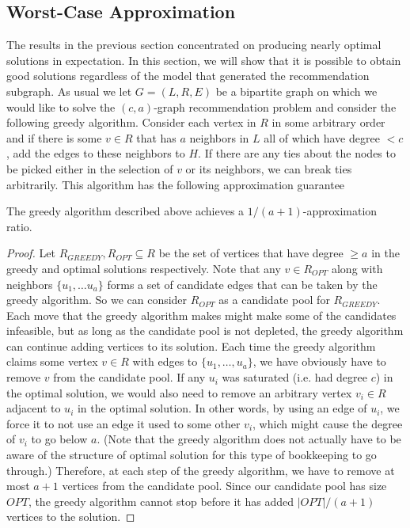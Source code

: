 %
\subsection{Worst-Case Approximation}
The results in the previous section concentrated on producing nearly
optimal solutions in expectation. In this section, we will show that
it is possible to obtain good solutions regardless of the model that
generated the recommendation subgraph. As usual we let $G=(L,R,E)$ be a
bipartite graph on which we would like to solve the $(c,a)$-graph
recommendation problem and consider the following greedy
algorithm. Consider each vertex in $R$ in some arbitrary order and if
there is some $v \in R$ that has $a$ neighbors in $L$ all of which
have degree $< c$, add the edges to these neighbors to $H$. If there
are any ties about the nodes to be picked either in the selection of
$v$ or its neighbors, we can break ties arbitrarily. This algorithm
has the following approximation guarantee

\begin{thm}
The greedy algorithm described above achieves a $1/(a+1)$-approximation ratio.
\end{thm}
\begin{proof}
Let $R_{GREEDY}, R_{OPT}\subseteq R$ be the set of vertices that have
degree $\geq a$ in the greedy and optimal solutions respectively. Note
that any $v \in R_{OPT}$ along with neighbors $\{u_1,\ldots u_a\}$
forms a set of candidate edges that can be taken by the greedy
algorithm. So we can consider $R_{OPT}$ as a candidate pool for
$R_{GREEDY}$. Each move that the greedy algorithm makes might make
some of the candidates infeasible, but as long as the candidate pool
is not depleted, the greedy algorithm can continue adding vertices to
its solution. Each time the greedy algorithm claims some vertex $v\in
R$ with edges to $\{u_1,\ldots, u_a\}$, we have obviously have to
remove $v$ from the candidate pool. If any $u_i$ was saturated
(i.e. had degree $c$) in the optimal solution, we would also need to
remove an arbitrary vertex $v_i\in R$ adjacent to $u_i$ in the optimal
solution. In other words, by using an edge of $u_i$, we force it to
not use an edge it used to some other $v_i$, which might cause the
degree of $v_i$ to go below $a$. (Note that the greedy algorithm does
not actually have to be aware of the structure of optimal solution for
this type of bookkeeping to go through.) Therefore, at each step of
the greedy algorithm, we have to remove at most $a+1$ vertices from
the candidate pool. Since our candidate pool has size $OPT$, the
greedy algorithm cannot stop before it has added $|OPT|/(a+1)$
vertices to the solution.
\end{proof}

